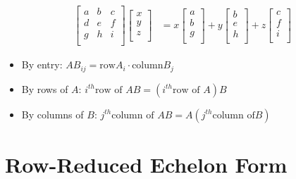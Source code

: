 \documentclass[14pt]{extreport}
\begin{document}
\begin{align*}
    \begin{bmatrix}
        a & b & c \\
        d & e & f \\
        g & h & i \\
    \end{bmatrix}
    \begin{bmatrix}
        x \\
        y \\
        z \\
    \end{bmatrix} &=
    x \begin{bmatrix}
        a \\
        b \\
        g \\
    \end{bmatrix} + 
    y \begin{bmatrix}
        b \\
        e \\
        h \\
    \end{bmatrix} + 
    z \begin{bmatrix}
        c \\
        f \\
        i \\
    \end{bmatrix}
\end{align*}

\begin{itemize}
    \item By entry: \( AB_{ij} = \text{row} A_i \cdot \text{column} B_j \)
    \item By rows of \(A\): \( i^{th} \text{row of } AB = (i^{th} \text{row of } A)B \)
    \item By columns of \(B\): \( j^{th} \text{column of } AB = A(j^{th} \text{column of} B) \)
\end{itemize}

\section{Row-Reduced Echelon Form}
\end{document}
